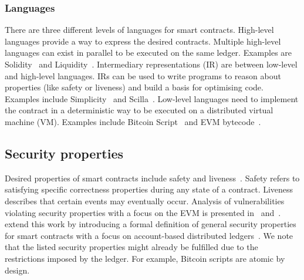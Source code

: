 \subsubsection{Languages}
There are three different levels of languages for smart contracts.
High-level languages provide a way to express the desired contracts. Multiple high-level languages can exist in parallel to be executed on the same ledger. Examples are Solidity~\cite{Ethereum2018Solidity} and Liquidity~\cite{OCamlProSAS2018}.
Intermediary representations (IR) are between low-level and high-level languages. IRs can be used to write programs to reason about properties (like safety or liveness) and build a basis for optimising code. Examples include Simplicity~\cite{OConnor2017} and Scilla~\cite{Sergey2018}.
Low-level languages need to implement the contract in a deterministic way to be executed on a distributed virtual machine (VM). Examples include Bitcoin Script~\cite{BitcoinWiki2018Script} and EVM bytecode~\cite{Wood2014}.





\subsection{Security properties}
Desired properties of smart contracts include safety and liveness~\cite{Sergey2018}.
Safety refers to satisfying specific correctness properties during any state of a contract.
Liveness describes that certain events may eventually occur.
Analysis of vulnerabilities violating security properties with a focus on the EVM is presented in~\cite{Luu2016} and~\cite{Atzei2017}.
\citeauthor{Grishchenko2018} extend this work by introducing a formal definition of general security properties for smart contracts with a focus on account-based distributed ledgers~\cite{Grishchenko2018}. We note that the listed security properties might already be fulfilled due to the restrictions imposed by the ledger. For example, Bitcoin scripts are atomic by design.

